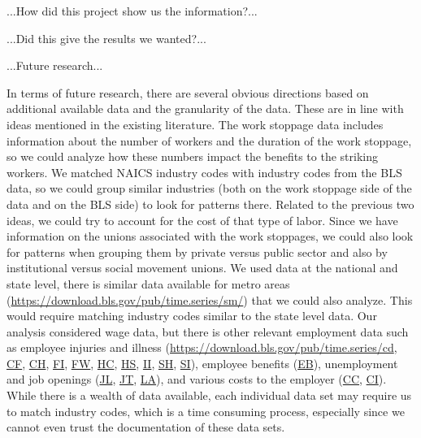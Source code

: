 \documentclass[reqno,11pt]{amsart}
\begin{document}
...How did this project show us the information?...


...Did this give the results we wanted?...


...Future research...

In terms of future research, there are several obvious directions based on 
additional available data and
the 
granularity of the data. These are in line with ideas mentioned in the existing literature.
The work stoppage data includes information about the 
number of workers and the duration of the work stoppage,
so we could analyze how these numbers impact the benefits to the striking 
workers. We matched NAICS industry codes with industry codes from the 
BLS data, so we could group similar industries (both on the work stoppage side
of the data and on the BLS side) to look for patterns there.
Related to the previous two ideas, we could try to account for the
cost of that type of labor. Since we have information on the unions 
associated with the work stoppages, we could also look for patterns 
when grouping them by private versus public sector and also by
institutional versus social movement unions. 
We used data at the national and state level, there is similar data
available for metro areas (\url{https://download.bls.gov/pub/time.series/sm/})
that we could also analyze. This would require matching industry codes
similar to the state level data. Our analysis considered wage data,
but there is other relevant employment data such as 
employee injuries and illness
(\url{https://download.bls.gov/pub/time.series/cd},
\href{https://download.bls.gov/pub/time.series/cf}{CF},
\href{https://download.bls.gov/pub/time.series/ch}{CH},
\href{https://download.bls.gov/pub/time.series/fi}{FI},
\href{https://download.bls.gov/pub/time.series/fw}{FW},
\href{https://download.bls.gov/pub/time.series/hc}{HC},
\href{https://download.bls.gov/pub/time.series/hs}{HS},    
\href{https://download.bls.gov/pub/time.series/ii}{II},
\href{https://download.bls.gov/pub/time.series/sh}{SH},
\href{https://download.bls.gov/pub/time.series/si}{SI}),
employee benefits
(\href{https://download.bls.gov/pub/time.series/eb}{EB}),
unemployment and job openings
(\href{https://download.bls.gov/pub/time.series/jl}{JL},
\href{https://download.bls.gov/pub/time.series/jt}{JT},
\href{https://download.bls.gov/pub/time.series/la}{LA}),
and various costs to the employer
(\href{https://download.bls.gov/pub/time.series/cc}{CC},
\href{https://download.bls.gov/pub/time.series/ci}{CI}).
While there is a wealth of data available, each individual data set
may require us to match industry codes, which is a time consuming
process, especially since we cannot even trust the documentation of
these data sets.















\end{document}
